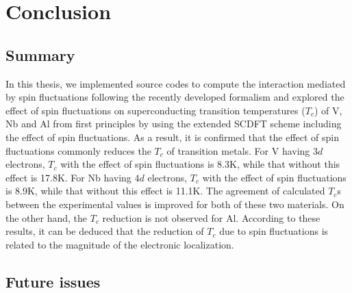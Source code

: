 

%
%
\chapter{Conclusion}
\label{conclusion}

\section{Summary}
In this thesis, we implemented source codes to compute the interaction mediated by spin fluctuations
following the recently developed formalism\cite{Essenberger2014}
and explored the effect of spin fluctuations on superconducting transition temperatures ($T_c$)
of V, Nb and Al from first principles by using the extended SCDFT scheme including the effect of 
spin fluctuations\cite{Essenberger2014}.
As a result, it is confirmed that the effect of spin fluctuations commonly
reduces the $T_c$ of transition metals. 
For V having $3d$ electrons, $T_c$ with the effect of spin fluctuations is 8.3K, while that 
without this effect is 17.8K.
For Nb having $4d$ electrons, $T_c$ with the effect of spin fluctuations is 8.9K, while that 
without this effect is 11.1K.
The agreement of calculated $T_c$s between the experimental values is improved for both of these 
two materials. On the other hand, the $T_c$ reduction is not observed for Al.
According to these results, it can be deduced that the reduction of $T_c$ due to spin fluctuations
is related to the magnitude of the electronic localization.

\section{Future issues}

